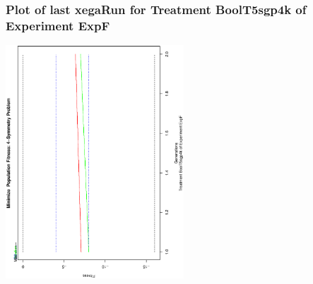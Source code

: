  \begin{frame}
 \frametitle{ Plot of last xegaRun for Treatment BoolT5sgp4k of Experiment ExpF }
 \begin{center}
\includegraphics[width=0.5\textwidth, angle=-90]
{ExpFPlotPopStatsFigure005.eps}
 \end{center}
 \label{report/ExpFPlotPopStatsFigure005.eps}  
 \end{frame}

